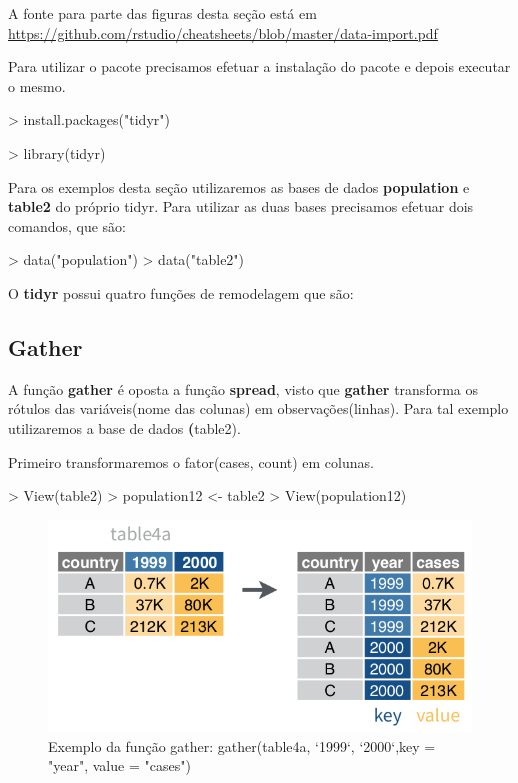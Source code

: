 \documentclass[12pt,a4paper,oneside]{erdc}
\begin{document}
A fonte para parte das figuras desta seção está em \url{https://github.com/rstudio/cheatsheets/blob/master/data-import.pdf}
	
	
Para utilizar o pacote precisamos efetuar a instalação do pacote e depois executar o mesmo.

\begin{Schunk}
\begin{Sinput}
> install.packages("tidyr")
\end{Sinput}
\end{Schunk}


\begin{Schunk}
\begin{Sinput}
> library(tidyr)
\end{Sinput}
\end{Schunk}
Para os exemplos desta seção utilizaremos as bases de dados \textbf{population} e \textbf{table2} do próprio tidyr. Para utilizar as duas bases precisamos efetuar dois comandos, que são:

\begin{Schunk}
\begin{Sinput}
> data("population")
> data("table2")
\end{Sinput}
\end{Schunk}

O \textbf{tidyr} possui quatro funções de remodelagem que são:

	
\subsection{Gather}	
A função \textbf{gather} é oposta a função \textbf{spread}, visto que \textbf{gather} transforma os rótulos das variáveis(nome das colunas) em observações(linhas). Para tal exemplo utilizaremos a base de dados \textbf(table2).

Primeiro transformaremos o fator(cases, count) em colunas.

\begin{Schunk}
\begin{Sinput}
> View(table2)
> population12 <- table2 %
> View(population12)
\end{Sinput}
\end{Schunk}

	
\begin{figure}[htpb]
	\centering
	\includegraphics[width=.6\linewidth]{../figs/BP_Curso_TecComp_00_2019_f03-04.png}
	\caption{Exemplo da função gather: gather(table4a, `1999`, `2000`,key = "year", value = "cases")}
	\label{fig:bpcursoteccomp002019f03-04}
\end{figure}
\end{document}
